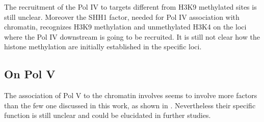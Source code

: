 \documentclass[a4paper, twocolumn]{article}
\begin{document}
The recruitment of the Pol IV to targets different from H3K9 methylated sites is still unclear. Moreover the SHH1 factor, needed for Pol IV association with chromatin, recognizes H3K9 methylation and unmethylated H3K4 on the loci where the Pol IV downstream is going to be recruited. \cite{LAW2013} It is still not clear how the histone methylation are initially established in the specific loci.


\subsection{On Pol V}

The association of Pol V to the chromatin involves seems to involve more factors than the few one discussed in this work, as shown in \cite{STROUD2012}. Nevertheless  their specific function is still unclear and could be elucidated in further studies. 




\end{document}
